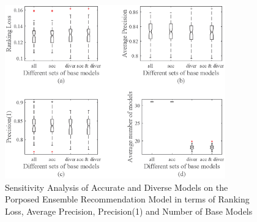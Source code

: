\documentclass[prodmode,acmtkdd]{acmsmall}
\begin{document}
\begin{figure}[!h]
	\centering
	\includegraphics[width=0.85\textwidth]{Figures/SensitiveAnalysis1}
	\caption{Sensitivity Analysis of Accurate and Diverse Models on the Porposed Ensemble Recommendation Model in terms of Ranking Loss, Average Precision, Precision(1) and Number of Base Models}\label{Fig:sensitiveAnalysis}
\end{figure}
\end{document}
